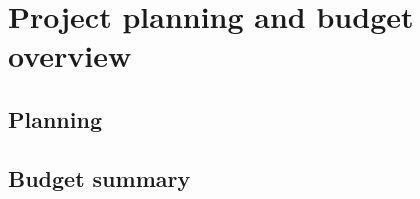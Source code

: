 \renewcommand{\documentname}{Project planning and budget overview}

\chapter{Project planning and budget overview}


\section{Planning}

\section{Budget summary}

